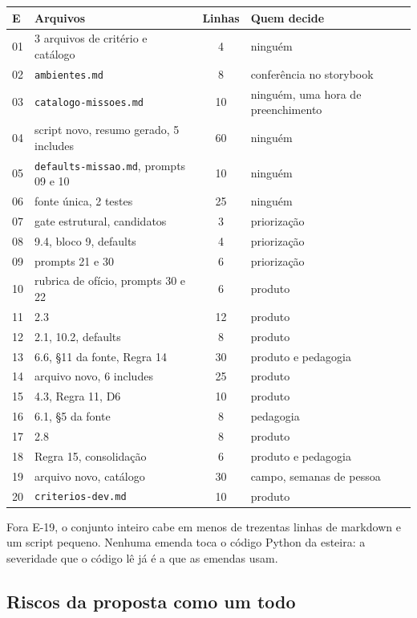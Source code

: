 \documentclass[11pt,a4paper]{article}
\begin{document}
\begin{center}\small
\begin{tabular}{@{}l p{6.4cm} c p{4.2cm}@{}}
\toprule
\textbf{E} & \textbf{Arquivos} & \textbf{Linhas} & \textbf{Quem decide} \\
\midrule
01 & 3 arquivos de critério e catálogo & 4 & ninguém \\
02 & \texttt{ambientes.md} & 8 & conferência no storybook \\
03 & \texttt{catalogo-missoes.md} & 10 & ninguém, uma hora de preenchimento \\
04 & script novo, resumo gerado, 5 includes & 60 & ninguém \\
05 & \texttt{defaults-missao.md}, prompts 09 e 10 & 10 & ninguém \\
06 & fonte única, 2 testes & 25 & ninguém \\
07 & gate estrutural, candidatos & 3 & priorização \\
08 & 9.4, bloco 9, defaults & 4 & priorização \\
09 & prompts 21 e 30 & 6 & priorização \\
10 & rubrica de ofício, prompts 30 e 22 & 6 & produto \\
11 & 2.3 & 12 & produto \\
12 & 2.1, 10.2, defaults & 8 & produto \\
13 & 6.6, \S11 da fonte, Regra 14 & 30 & produto e pedagogia \\
14 & arquivo novo, 6 includes & 25 & produto \\
15 & 4.3, Regra 11, D6 & 10 & produto \\
16 & 6.1, \S5 da fonte & 8 & pedagogia \\
17 & 2.8 & 8 & produto \\
18 & Regra 15, consolidação & 6 & produto e pedagogia \\
19 & arquivo novo, catálogo & 30 & campo, semanas de pessoa \\
20 & \texttt{criterios-dev.md} & 10 & produto \\
\bottomrule
\end{tabular}
\end{center}

Fora E-19, o conjunto inteiro cabe em menos de trezentas linhas de markdown e um script pequeno.
Nenhuma emenda toca o código Python da esteira: a severidade que o código lê já é a que as emendas
usam.

\subsection{Riscos da proposta como um todo}
\end{document}
